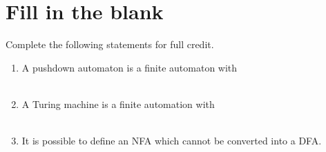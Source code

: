 \documentclass[10pt]{amsart}
\begin{document}
\section{Fill in the blank}
Complete the following statements for full credit.\\

\begin{enumerate}
\item A pushdown automaton is a finite automaton with\hfill\underline{\hspace{2.3in}}\\\\
\item A Turing machine is a finite automation with\hfill\underline{\hspace{2.6in}}\\\\
\item It is \underline{\hspace{2in}} possible to define an NFA which cannot be converted into a DFA. 
\end{enumerate}
\end{document}
